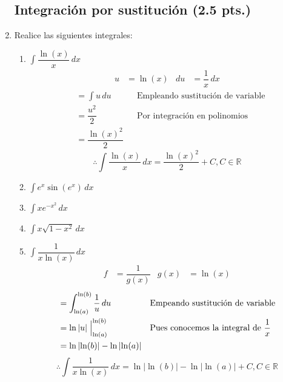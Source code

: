 \documentclass[letterpaper]{article}
\providecommand{\abs}[1]{\left|#1\right|}
\newcommand{\R}{\mathds{R}}
\renewcommand{\*}{\cdot}
\theoremstyle{definition}
\begin{document}
\begin{enumerate}
\subsection*{Integración por sustitución (2.5 pts.)}
\item  Realice las siguientes integrales:
\begin{enumerate}
\item$\displaystyle \int \dfrac{\ln(x)}{x} \, dx$
\begin{align*}
	u & = \ln(x) & du &= \dfrac{1}{x}\,dx
\end{align*}
\begin{align*}
	&= \int u\,du &&\text{Empleando sustitución de variable}\\
	&= \dfrac{u^2}{2} &&\text{Por integración en polinomios}\\
	&= \dfrac{\ln(x)^2}{2}
\end{align*}
\[ \therefore \int \dfrac{\ln(x)}{x} \, dx = \dfrac{\ln(x)^2}{2} + C, C \in \R \]
\item$\displaystyle \int e^x \sin(e^x) \, dx$
\item$\displaystyle \int xe^{-x^2} \, dx$
\item$\displaystyle \int x\sqrt{1- x^2} \, dx$
\item$\displaystyle \int \dfrac{1}{x \ln(x)} \, dx$
\begin{align*}
	f&= \dfrac{1}{g(x)} & g(x) &= \ln(x)
\end{align*}
\begin{align*}
	&= \int_{\ln(a)}^{\ln(b)} \dfrac{1}{u}\,du &&\text{Empeando sustitución de variable}\\
	&= \ln\abs{u}\Bigm|_{\ln(a)}^{\ln(b)} &&\text{Pues conocemos la integral de }\dfrac{1}{x}\\
	&= \ln\abs{\ln(b)} - \ln\abs{\ln(a)}
\end{align*}
\[ \therefore \int \dfrac{1}{x \ln(x)} \, dx = \ln\abs{\ln(b)} - \ln\abs{\ln(a)} + C, C \in \R \]
\end{enumerate}


\end{enumerate}
\end{document}

